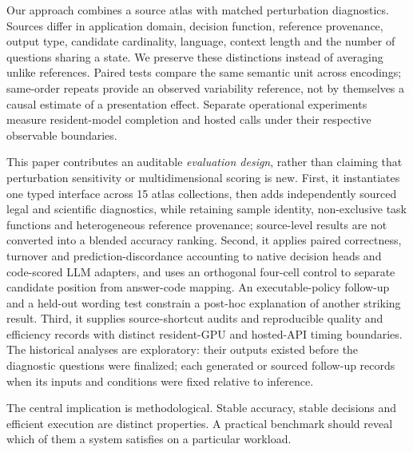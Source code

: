 Our approach combines a source atlas with matched perturbation diagnostics. Sources differ in application domain, decision function, reference provenance, output type, candidate cardinality, language, context length and the number of questions sharing a state. We preserve these distinctions instead of averaging unlike references. Paired tests compare the same semantic unit across encodings; same-order repeats provide an observed variability reference, not by themselves a causal estimate of a presentation effect. Separate operational experiments measure resident-model completion and hosted calls under their respective observable boundaries.

This paper contributes an auditable \emph{evaluation design}, rather than claiming that perturbation sensitivity or multidimensional scoring is new. First, it instantiates one typed interface across 15 atlas collections, then adds independently sourced legal and scientific diagnostics, while retaining sample identity, non-exclusive task functions and heterogeneous reference provenance; source-level results are not converted into a blended accuracy ranking. Second, it applies paired correctness, turnover and prediction-discordance accounting to native decision heads and code-scored LLM adapters, and uses an orthogonal four-cell control to separate candidate position from answer-code mapping. An executable-policy follow-up and a held-out wording test constrain a post-hoc explanation of another striking result. Third, it supplies source-shortcut audits and reproducible quality and efficiency records with distinct resident-GPU and hosted-API timing boundaries. The historical analyses are exploratory: their outputs existed before the diagnostic questions were finalized; each generated or sourced follow-up records when its inputs and conditions were fixed relative to inference.

The central implication is methodological. Stable accuracy, stable decisions and efficient execution are distinct properties. A practical benchmark should reveal which of them a system satisfies on a particular workload.

